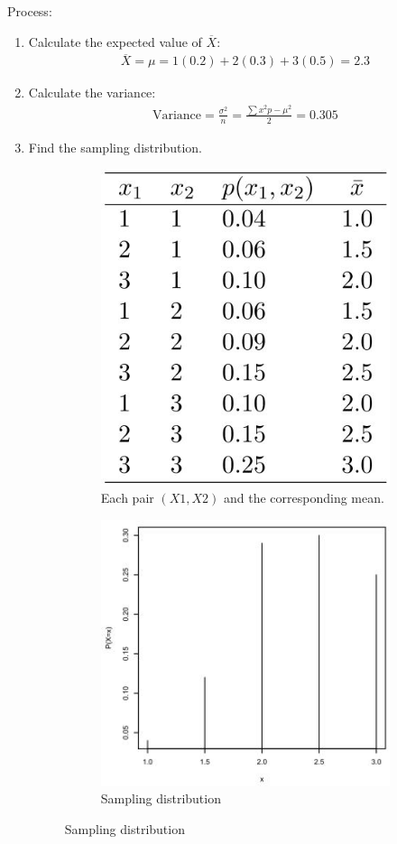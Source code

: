 \documentclass[10pt,a4paper]{article}
\begin{document}
Process: 
\begin{enumerate}
    \item Calculate the expected value of $\overline{X}$:
    \begin{align*}
        \overline{X} = \mu = 1(0.2) + 2(0.3) + 3(0.5) = 2.3
    \end{align*}
    \item Calculate the variance:
    \begin{align*}
        \text{Variance} = \frac{\sigma^2}{n} = \frac{\sum x^2p - \mu^2}{2} = 0.305
    \end{align*}
    \pagebreak
    \item Find the sampling distribution.
    \begin{figure} [h]
    \centering
    \begin{subfigure}{.5\textwidth}
      \centering
      \includegraphics[scale=0.45]{sampling distr1.JPG}
      \caption{Each pair $(X1, X2)$ and the corresponding mean.}
      \label{fig:sub1}
    \end{subfigure}%
    \begin{subfigure}{.5\textwidth}
      \centering
      \includegraphics[scale=0.66]{sampling distr2.JPG}
      \caption{Sampling distribution}
      \label{fig:sub2}
    \end{subfigure}
 
    \end{figure}
\end{enumerate}
\end{document}
